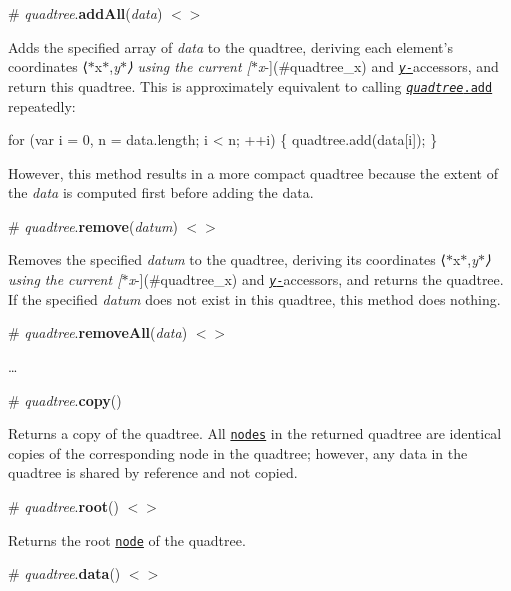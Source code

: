 \label{_quadtree_addAll}%
\# {\itshape quadtree}.{\bfseries add\+All}({\itshape data}) \href{https://github.com/d3/d3-quadtree/blob/master/src/add.js#L50}{\tt $<$$>$}

Adds the specified array of {\itshape data} to the quadtree, deriving each element’s coordinates ⟨$\ast$x$\ast$,{\itshape y$\ast$⟩ using the current \mbox{[}$\ast$x}-\/\mbox{]}(\#quadtree\+\_\+x) and \href{#quadtree_y}{\tt {\itshape y}-\/}accessors, and return this quadtree. This is approximately equivalent to calling \href{#quadtree_add}{\tt {\itshape quadtree}.add} repeatedly\+:


\begin{DoxyCode}
for (var i = 0, n = data.length; i < n; ++i) \{
  quadtree.add(data[i]);
\}
\end{DoxyCode}


However, this method results in a more compact quadtree because the extent of the {\itshape data} is computed first before adding the data.

\label{_quadtree_remove}%
\# {\itshape quadtree}.{\bfseries remove}({\itshape datum}) \href{https://github.com/d3/d3-quadtree/blob/master/src/remove.js}{\tt $<$$>$}

Removes the specified {\itshape datum} to the quadtree, deriving its coordinates ⟨$\ast$x$\ast$,{\itshape y$\ast$⟩ using the current \mbox{[}$\ast$x}-\/\mbox{]}(\#quadtree\+\_\+x) and \href{#quadtree_y}{\tt {\itshape y}-\/}accessors, and returns the quadtree. If the specified {\itshape datum} does not exist in this quadtree, this method does nothing.

\label{_quadtree_removeAll}%
\# {\itshape quadtree}.{\bfseries remove\+All}({\itshape data}) \href{https://github.com/d3/d3-quadtree/blob/master/src/remove.js#L59}{\tt $<$$>$}

…

\label{_quadtree_copy}%
\# {\itshape quadtree}.{\bfseries copy}()

Returns a copy of the quadtree. All \href{#nodes}{\tt nodes} in the returned quadtree are identical copies of the corresponding node in the quadtree; however, any data in the quadtree is shared by reference and not copied.

\label{_quadtree_root}%
\# {\itshape quadtree}.{\bfseries root}() \href{https://github.com/d3/d3-quadtree/blob/master/src/root.js}{\tt $<$$>$}

Returns the root \href{#nodes}{\tt node} of the quadtree.

\label{_quadtree_data}%
\# {\itshape quadtree}.{\bfseries data}() \href{https://github.com/d3/d3-quadtree/blob/master/src/data.js}{\tt $<$$>$}

